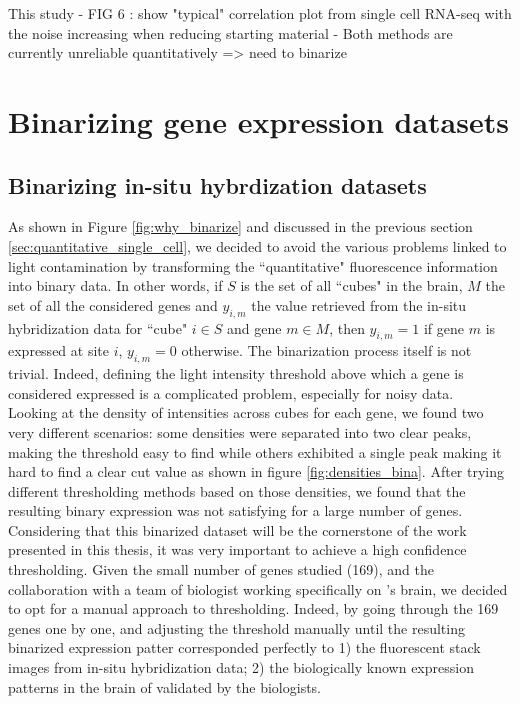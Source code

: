   This study 
    - FIG 6 : show "typical" correlation plot from single cell RNA-seq with the noise increasing when reducing starting material
    - Both methods are currently unreliable quantitatively => need to binarize

\section{Binarizing gene expression datasets}\label{sec:binarizing}
  \subsection{Binarizing in-situ hybrdization datasets}
	As shown in Figure \ref{fig:why_binarize} and discussed in the previous section \ref{sec:quantitative_single_cell}, we decided to avoid the various problems linked to light contamination by transforming the ``quantitative" fluorescence information into binary data. In other words, if $S$ is the set of all ``cubes" in the brain, $M$ the set of all the considered genes and $y_{i,m}$ the value retrieved from the in-situ hybridization data for ``cube" $i \in S$ and gene $m \in M$, then  $y_{i,m} = 1$ if gene $m$ is expressed at site $i$, $y_{i,m} = 0$ otherwise. The binarization process itself is not trivial. Indeed, defining the light intensity threshold above which a gene is considered expressed is a complicated problem, especially for noisy data.\\

	Looking at the density of intensities across cubes for each gene, we found two very different scenarios: some densities were separated into two clear peaks, making the threshold easy to find while others exhibited a single peak making it hard to find a clear cut value as shown in figure \ref{fig:densities_bina}. After trying different thresholding methods based on those densities, we found that the resulting binary expression was not satisfying for a large number of genes. Considering that this binarized dataset will be the cornerstone of the work presented in this thesis, it was very important to achieve a high confidence thresholding. Given the small number of genes studied (169), and the collaboration with a team of biologist working specifically on \platyfull{}'s brain, we decided to opt for a manual approach to thresholding. Indeed, by going through the 169 genes one by one, and adjusting the threshold manually until the resulting binarized expression patter corresponded perfectly to 1) the fluorescent stack images from in-situ hybridization data; 2) the biologically known expression patterns in the brain of \platy{} validated by the biologists.\\
	

